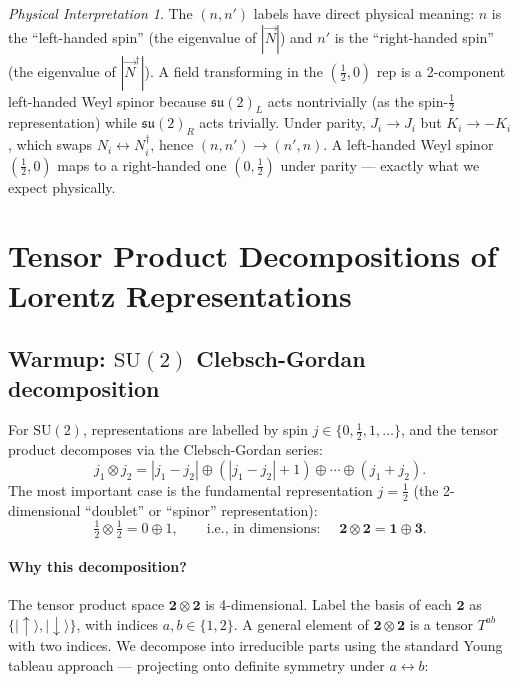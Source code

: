\documentclass[12pt]{article}
\theoremstyle{remark}
\newtheorem*{physinterp}{Physical Interpretation}
\begin{document}
\begin{physinterp}
  The $(n,n')$ labels have direct physical meaning:
  $n$ is the ``left-handed spin'' (the eigenvalue of $|\vec{N}|$)
  and $n'$ is the ``right-handed spin'' (the eigenvalue of $|\vec{N}^\dagger|$).
  A field transforming in the $(\tfrac{1}{2},0)$ rep is a 2-component left-handed
  Weyl spinor because $\mathfrak{su}(2)_L$ acts nontrivially (as the spin-$\tfrac{1}{2}$
  representation) while $\mathfrak{su}(2)_R$ acts trivially.
  Under parity, $J_i \to J_i$ but $K_i \to -K_i$, which swaps $N_i \leftrightarrow N_i^\dagger$,
  hence $(n,n') \to (n',n)$.
  A left-handed Weyl spinor $(\tfrac{1}{2},0)$ maps to a right-handed one $(0,\tfrac{1}{2})$
  under parity --- exactly what we expect physically.
\end{physinterp}

\section{Tensor Product Decompositions of Lorentz Representations}

\subsection{Warmup: \texorpdfstring{$\mathrm{SU}(2)$}{SU(2)} Clebsch-Gordan decomposition}

For $\mathrm{SU}(2)$, representations are labelled by spin $j \in \{0,\tfrac{1}{2},1,\ldots\}$,
and the tensor product decomposes via the Clebsch-Gordan series:
\begin{equation}
  j_1 \otimes j_2 = |j_1-j_2| \oplus (|j_1-j_2|+1) \oplus \cdots \oplus (j_1+j_2).
  \label{eq:CG}
\end{equation}
The most important case is the fundamental representation $j=\tfrac{1}{2}$
(the 2-dimensional ``doublet'' or ``spinor'' representation):
\begin{equation}
  \tfrac{1}{2} \otimes \tfrac{1}{2}
  = 0 \oplus 1,
  \qquad\text{i.e., in dimensions: }\quad
  \mathbf{2} \otimes \mathbf{2} = \mathbf{1} \oplus \mathbf{3}.
\end{equation}

\paragraph{Why this decomposition?}
The tensor product space $\mathbf{2}\otimes\mathbf{2}$ is 4-dimensional.
Label the basis of each $\mathbf{2}$ as $\{|{\uparrow}\rangle, |{\downarrow}\rangle\}$,
with indices $a,b \in \{1,2\}$.  A general element of $\mathbf{2}\otimes\mathbf{2}$
is a tensor $T^{ab}$ with two indices.  We decompose into irreducible parts using
the standard Young tableau approach --- projecting onto definite symmetry under
$a \leftrightarrow b$:
\end{document}

